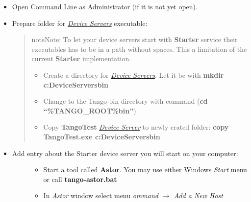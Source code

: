 \documentclass[letterpaper,10pt,english]{sphinxmanual}
\begin{document}
\begin{itemize}
\item {} 
Open Command Line as Administrator (if it is not yet open).

\item {} 
Prepare folder for {\hyperref[glossary:term-device-servers]{\emph{Device Servers}}} executable:
\begin{quote}

\begin{notice}{note}{Note:}
To let your device servers start with \textbf{Starter} service their executables has to be in a path without
spaces. This a limitation of the current \textbf{Starter} implementation.
\end{notice}
\begin{itemize}
\item {} 
Create a directory for {\hyperref[glossary:term-device-servers]{\emph{Device Servers}}}. Let it be 
with \textbf{mkdir c:DeviceServersbin}

\item {} 
Change to the Tango bin directory with command (\textbf{cd ``\%TANGO\_ROOT\%bin''})

\item {} 
Copy \textbf{TangoTest} {\hyperref[glossary:term-device-server]{\emph{Device Server}}} to newly crated folder:
\textbf{copy TangoTest.exe c:DeviceServersbin}

\end{itemize}
\end{quote}

\item {} \begin{description}
\item[{Add entry about the Starter device server you will start on your computer:}] \leavevmode\begin{itemize}
\item {} 
Start a tool called \textbf{Astor}. You may use either Windows \emph{Start} menu or
call \textbf{tango-astor.bat}

\item {} 
In \emph{Astor} window select menu \emph{ommand \(\rightarrow\) Add a New Host}


\end{itemize}
\end{description}
\end{itemize}
\end{document}
